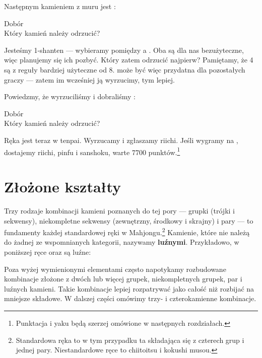 \pagebreak
Następnym kamieniem z muru jest :
\begin{screen}
	\vspace{-15pt}\hfill{\footnotesize{Dobór~~~~~~~~~}}\\
	\vspace{-2pt}Który kamień należy odrzucić?\vspace{-5pt}
\end{screen}
Jesteśmy 1-{\jap shanten} --- wybieramy pomiędzy  a .
Oba są dla nas bezużyteczne, więc planujemy się ich pozbyć.
Który zatem odrzucić najpierw?
Pamiętamy, że 4 są z reguły bardziej użyteczne od 8.
 może być więc przydatna dla pozostałych graczy --- zatem im wcześniej ją wyrzucimy, tym lepiej. 

\bigskip
Powiedzmy, że wyrzuciliśmy  i dobraliśmy :
\begin{screen}
	\vspace{-15pt}\hfill{\footnotesize{Dobór~~~~~~~~~}}\\
	\vspace{-2pt}Który kamień należy odrzucić?\vspace{-5pt}
\end{screen}
\noindent
Ręka jest teraz w {\jap tenpai}.
Wyrzucamy  i zgłaszamy {\jap riichi}.
Jeśli wygramy na , dostajemy {\jap riichi}, {\jap pinfu} i {\jap sanshoku}, warte 7700 punktów.\footnote{Punktacja i {\jap yaku} będą szerzej omówione w następnych rozdziałach.}

\newpage
\section{Złożone kształty}
Trzy rodzaje kombinacji kamieni poznanych do tej pory --- grupki (trójki i sekwensy), niekompletne sekwensy (zewnętrzny, środkowy i skrajny) i pary --- to fundamenty każdej standardowej ręki w Mahjongu.\footnote{
	Standardowa ręka to w tym przypadku ta składająca się z czterech grup i jednej pary.
	Niestandardowe ręce to {\jap chiitoitsu} i {\jap kokushi musou}.
}
Kamienie, które nie należą do żadnej ze wspomnianych kategorii, nazywamy {\bf luźnymi}.
Przykładowo, w poniższej ręce  oraz  są luźne:
\begin{screen}
\end{screen}
Poza wyżej wymienionymi elementami często napotykamy rozbudowane kombinacje złożone z dwóch lub więcej grupek, niekompletnych grupek, par i luźnych kamieni.
Takie kombinacje lepiej rozpatrywać jako całość niż rozbijać na mniejsze składowe.
W dalszej części omówimy trzy- i czterokamienne kombinacje.

